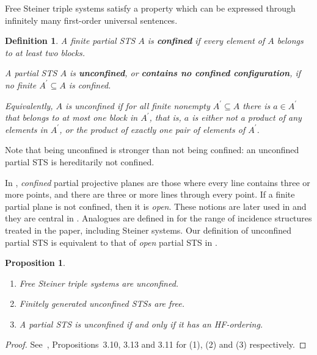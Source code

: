 \documentclass[a4paper, 11pt]{article}
\theoremstyle{note}
\newtheorem{df}[thm]{Definition}
\newtheorem{prop}[thm]{Proposition}
\begin{document}
	Free Steiner triple systems satisfy a property which can be expressed through infinitely many first-order universal sentences. 
	
				\begin{df} %
 A finite partial STS  $A$ is \textbf{confined} if every element of $A$ belongs to at least two blocks.

A partial STS %
 $A$ is \textbf{unconfined}, or \textbf{contains no confined configuration}, if no finite $A^\prime \subseteq A$ is confined.

Equivalently,  $A$ is unconfined if for all finite  nonempty $A^\prime \subseteq A$ there is $a \in A^\prime$ that belongs to at most one block in $A^\prime$, that is, $a$ is either not a product of any elements in $A^\prime$, or the product of exactly one pair of elements of $A^\prime$.
\end{df}
Note that being unconfined is stronger than not being confined: an unconfined partial STS is hereditarily not confined. 
	
	In \cite{hall}, \textit{confined} partial projective planes are those where every line contains three or more points, and there are three or more lines through every point. If a finite partial plane is not confined, then it is \textit{open}. These notions are later used in \cite{sieben} and they are central in  \cite{hyttpao}. Analogues are defined in \cite{funk} for the range of incidence structures treated in the paper, including Steiner systems. %
Our definition of unconfined partial STS is equivalent to that of \textit{open} partial STS in \cite{funk}.
	
	\begin{prop}\label{unconfined} \begin{enumerate}
			\item Free Steiner triple systems are unconfined.
			\item Finitely generated unconfined STSs are free.
			\item A partial STS is unconfined if and only if it has an HF-ordering.
		\end{enumerate}
	\end{prop}
	\begin{proof} See~\cite{barcas2}, Propositions~3.10, 3.13 and 3.11 for (1), (2) and (3) respectively.
	\end{proof}
	
\end{document}
